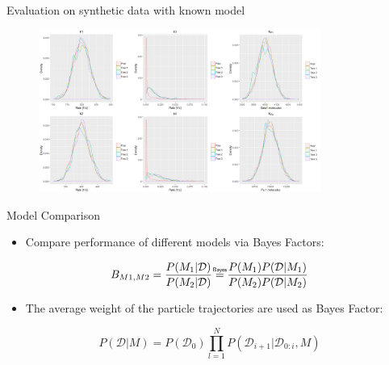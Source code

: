 \documentclass[pdf]
{beamer}
\newcommand\bayeseq{\mathrel{\overset{\makebox[0pt]{\mbox{\normalfont\tiny\sffamily Bayes}}}{=}}}
\begin{document}
\begin{frame}{Evaluation on synthetic data with known model}

	\begin{figure}[ht]
		\begin{center}
			\includegraphics[height=2.1in]{figures/real_vertical.PNG}
		\end{center}
	\end{figure}
\end{frame}

\begin{frame}{Model Comparison}
	\begin{itemize}
		\item Compare performance of different models via Bayes Factors:
	\end{itemize}
	
	\begin{equation}
		B_{M1, M2} = \frac{P(M_1 | \mathcal{D})}{P(M_2 | \mathcal{D})}  \bayeseq \frac{P(M_1) P(\mathcal{D}| M_1)}{P(M_2) P(\mathcal{D} | M_2)} \label{eq:6}
	\end{equation}

	\begin{itemize}
		\item The average weight of the particle trajectories are used as Bayes Factor:
	\end{itemize}

	\begin{equation}
	P(\mathcal{D} | M) = P(\mathcal{D_0}) \prod_{l=1}^{N} P(\mathcal{D}_{i+1} | \mathcal{D}_{0:i}, M)\label{eq:7}
	\end{equation}

\end{frame}
\end{document}
